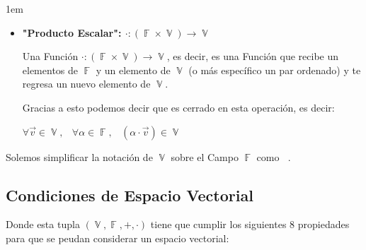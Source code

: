 \documentclass[12pt, fleqn]{report}                             %
\newenvironment{SmallIndentation}[1][0.75em]                    %
        {\begin{adjustwidth}{#1}{}\begin{footnotesize}}             %
        {\end{footnotesize}\end{adjustwidth}}                       %
\DeclareMathOperator \Space {\quad}                             %
\DeclareMathOperator \MiniSpace {\;}                            %
\theoremstyle{break}                                            %
\DeclareMathOperator \GenericField {\mathbb{F}}                 %
\DeclareMathOperator \VectorSet    {\mathbb{V}}                 %
\DeclareMathOperator \VectorSpace  {\VectorSet_{\GenericField}} %
\begin{document}
\begin{SmallIndentation}[1em]
\begin{itemize}
                    \item
                        \textbf{"Producto Escalar": $\cdot: (\GenericField \times  \VectorSet) \to \VectorSet$}

                        Una Función $\cdot: (\GenericField \times  \VectorSet) \to \VectorSet$, es decir, es una Función
                        que recibe un elementos de $\GenericField$ y un elemento de $\VectorSet$
                        (o más específico un par ordenado) y te regresa un nuevo elemento de $\VectorSet$.

                        Gracias a esto podemos decir que es cerrado en esta operación, es decir:

                        $\forall \vec{v} \in \VectorSet, \MiniSpace
                            \forall \alpha \in \GenericField, \MiniSpace
                                (\alpha \cdot \vec{v}) \in \VectorSet$  
                \end{itemize}
            
            \end{SmallIndentation}

            Solemos simplificar la notación de $\VectorSet$ sobre el Campo $\GenericField$ como $\VectorSpace$.


            \subsection{Condiciones de Espacio Vectorial}

                Donde esta tupla $(\VectorSet, \GenericField, +, \cdot)$ tiene que cumplir los siguientes 8
                propiedades para que se peudan considerar un espacio vectorial:
\end{document}
